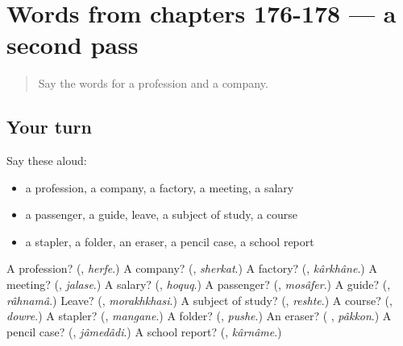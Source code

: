\section[(dialogue)]{Words from chapters 176-178 — a second pass}

\label{lesson:FA-R178-second-pass-words-from-chapters-176-178}



\begin{quote}
Say the words for a profession and a company.
\end{quote}

\subsection*{Your turn}
Say these aloud:

\begin{itemize}
\raggedright
  \item a profession, a company, a factory, a meeting, a salary
  \item a passenger, a guide, leave, a subject of study, a course
  \item a stapler, a folder, an eraser, a pencil case, a school report
\end{itemize}

\begin{tcolorbox}[breakable,colback=teal!4,colframe=teal!35!black,title={Before you move on}]
A profession? (\textbf{}, \emph{herfe}.) A company? (\textbf{}, \emph{sherkat}.) A factory? (\textbf{}, \emph{kârkhâne}.) A meeting? (\textbf{}, \emph{jalase}.) A salary? (\textbf{}, \emph{hoquq}.) A passenger? (\textbf{}, \emph{mosâfer}.) A guide? (\textbf{}, \emph{râhnamâ}.) Leave? (\textbf{}, \emph{morakhkhasi}.) A subject of study? (\textbf{}, \emph{reshte}.) A course? (\textbf{}, \emph{dowre}.) A stapler? (\textbf{}, \emph{mangane}.) A folder? (\textbf{}, \emph{pushe}.) An eraser? (\textbf{ }, \emph{pâkkon}.) A pencil case? (\textbf{}, \emph{jâmedâdi}.) A school report? (\textbf{}, \emph{kârnâme}.)
\end{tcolorbox}
